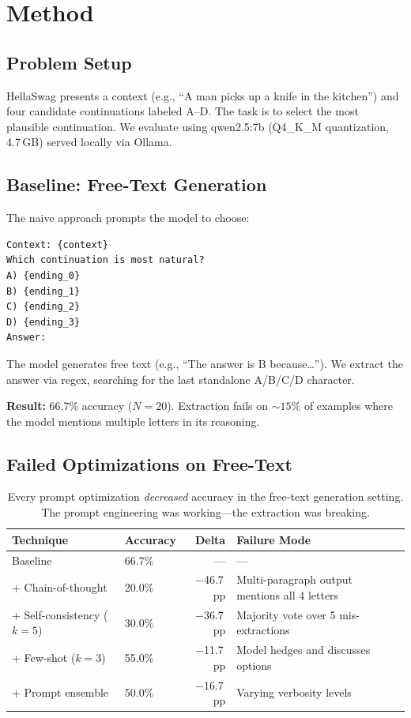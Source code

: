 \documentclass[11pt]{article}
\begin{document}
\section{Method}

\subsection{Problem Setup}

HellaSwag \citep{zellers2019} presents a context (e.g., ``A man picks up a knife in the kitchen'') and four candidate continuations labeled A--D. The task is to select the most plausible continuation. We evaluate using qwen2.5:7b (Q4\_K\_M quantization, 4.7\,GB) served locally via Ollama.

\subsection{Baseline: Free-Text Generation}

The naive approach prompts the model to choose:

\begin{verbatim}
Context: {context}
Which continuation is most natural?
A) {ending_0}
B) {ending_1}
C) {ending_2}
D) {ending_3}
Answer:
\end{verbatim}

The model generates free text (e.g., ``The answer is B because\ldots''). We extract the answer via regex, searching for the last standalone A/B/C/D character.

\textbf{Result:} 66.7\% accuracy ($N{=}20$). Extraction fails on ${\sim}15\%$ of examples where the model mentions multiple letters in its reasoning.

\subsection{Failed Optimizations on Free-Text}

\begin{table}[h]
\centering
\begin{tabular}{@{}llrl@{}}
\toprule
Technique & Accuracy & Delta & Failure Mode \\
\midrule
Baseline & 66.7\% & --- & --- \\
+ Chain-of-thought & 20.0\% & $-$46.7\,pp & Multi-paragraph output mentions all 4 letters \\
+ Self-consistency ($k{=}5$) & 30.0\% & $-$36.7\,pp & Majority vote over 5 mis-extractions \\
+ Few-shot ($k{=}3$) & 55.0\% & $-$11.7\,pp & Model hedges and discusses options \\
+ Prompt ensemble & 50.0\% & $-$16.7\,pp & Varying verbosity levels \\
\bottomrule
\end{tabular}
\caption{Every prompt optimization \emph{decreased} accuracy in the free-text generation setting. The prompt engineering was working---the extraction was breaking.}
\label{tab:failed}
\end{table}
\end{document}
